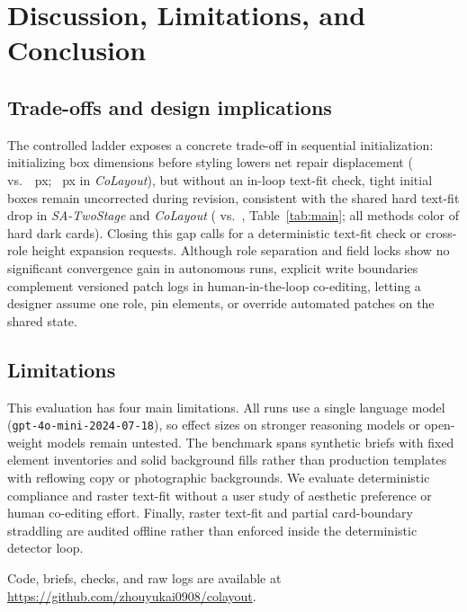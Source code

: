 \documentclass[conference]{IEEEtran}
\newif\ifanonymous
\begin{document}
\section{Discussion, Limitations, and Conclusion}\label{sec:discussion}
\subsection{Trade-offs and design implications}
The controlled ladder exposes a concrete trade-off in sequential initialization:
initializing box dimensions before styling lowers net repair displacement
(\vDispTwoStage{} vs.\ \vDispSABB{}~px; \vDispFull{}~px in \emph{CoLayout}), but without an in-loop text-fit check,
tight initial boxes remain uncorrected during revision, consistent with the
shared \vDFitHardSeq{} hard text-fit drop in \emph{SA-TwoStage} and
\emph{CoLayout} (\vFitHardFull{} vs.\ \vFitHardSABB{}, Table~\ref{tab:main};
all methods color \vCardHardAll{} of hard dark cards). Closing this gap calls for a deterministic text-fit check or cross-role height
expansion requests. Although role separation and field locks show no significant
convergence gain in autonomous runs, explicit write boundaries complement
versioned patch logs in human-in-the-loop co-editing, letting a designer assume one role, pin elements,
or override automated patches on the shared state.

\subsection{Limitations}
This evaluation has four main limitations. All \vRunsTotal{} runs use a single
language model (\texttt{gpt-4o-mini-2024-07-18}), so effect sizes on stronger
reasoning models or open-weight models remain untested. The benchmark spans
\vBriefCount{} synthetic briefs with fixed element inventories and solid
background fills rather than production templates with reflowing copy or
photographic backgrounds. We evaluate deterministic compliance and raster
text-fit without a user study of aesthetic preference or human co-editing
effort. Finally, raster text-fit and partial card-boundary straddling are
audited offline rather than enforced inside the deterministic detector loop.
\ifanonymous
Code, briefs, and raw logs will be released upon acceptance.
\else
Code, briefs, checks, and raw logs are available at
\url{https://github.com/zhouyukai0908/colayout}.
\fi
\end{document}
